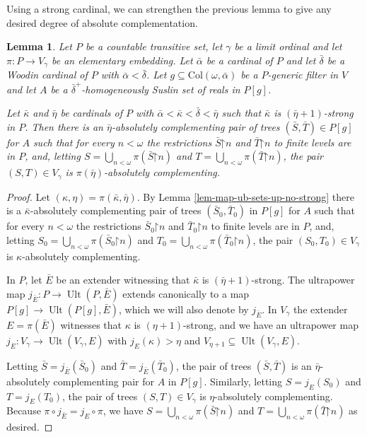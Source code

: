 \documentclass[fleqn, 11pt]{amsart}
\theoremstyle{plain}
\newtheorem{lem}[thm]{Lemma} \newtheorem*{lem*}{Lemma}
\theoremstyle{definition}
\theoremstyle{remark}
\newcommand{\Col}{\mathrm{Col}}
\newcommand{\restrict}{\mathord{\restriction}}
\DeclareMathOperator{\Ult}{Ult}
\begin{document}
Using a strong cardinal, we can strengthen the previous lemma to give any desired degree of absolute complementation.


\begin{lem}\label{lem-map-ub-sets-up}
 Let $P$ be a countable transitive set, let $\gamma$ be a limit ordinal and let $\pi \colon P \to V_{\gamma}$ be an elementary embedding. Let $\bar{\alpha}$ be a cardinal of $P$ and let $\bar{\delta}$ be a Woodin cardinal of $P$ with $\bar{\alpha} < \bar{\delta}$. Let $g \subseteq \Col(\omega,\bar{\alpha})$ be a $P$-generic filter in $V$ and let $A$ be a $\bar{\delta}^+$-homogeneously Suslin set of reals in $P[g]$.

 Let $\bar{\kappa}$ and $\bar{\eta}$ be cardinals of $P$ with $\bar{\alpha} < \bar{\kappa} < \bar{\delta} < \bar{\eta}$ such that $\bar{\kappa}$ is $(\bar{\eta}+1)$-strong in $P$. Then there is an $\bar{\eta}$-absolutely complementing pair of trees $(\bar{S},\bar{T}) \in P[g]$ for $A$ such that for every $n < \omega$ the restrictions $\bar{S}\restrict n$ and $\bar{T} \restrict n$ to finite levels are in $P$, and, letting $S = \bigcup_{n<\omega} \pi(\bar{S}\restrict n)$ and $T = \bigcup_{n<\omega} \pi(\bar{T}\restrict n)$, the pair $(S,T) \in V_{\gamma}$ is $\pi(\bar{\eta})$-absolutely complementing.
\end{lem}

\begin{proof}
 Let $(\kappa, \eta) = \pi(\bar{\kappa}, \bar{\eta})$. By Lemma \ref{lem-map-ub-sets-up-no-strong} there is a $\bar{\kappa}$-absolutely complementing pair of trees $(\bar{S}_0, \bar{T}_0)$ in $P[g]$ for $A$ such that for every $n < \omega$ the restrictions $\bar{S}_0\restrict n$ and $\bar{T}_0 \restrict n$ to finite levels are in $P$, and, letting $S_0 = \bigcup_{n<\omega} \pi(\bar{S}_0\restrict n)$ and $T_0 = \bigcup_{n<\omega} \pi(\bar{T}_0\restrict n)$, the pair $(S_0,T_0) \in V_{\gamma}$ is $\kappa$-absolutely complementing.
  
 In $P$, let $\bar{E}$ be an extender witnessing that $\bar{\kappa}$ is $(\bar{\eta}+1)$-strong. The ultrapower map $j_{\bar{E}} \colon P \to \Ult(P, \bar{E})$ extends canonically to a map $P[g] \to \Ult(P[g], \bar{E})$, which we will also denote by $j_{\bar{E}}$. In $V_{\gamma}$ the extender $E = \pi(\bar{E})$ witnesses that $\kappa$ is $(\eta+1)$-strong, and we have an ultrapower map $j_E : V_{\gamma} \to \Ult(V_{\gamma}, E)$ with $j_{E}(\kappa) > \eta$ and $V_{\eta + 1} \subseteq \Ult(V_{\gamma}, E)$. 

 Letting $\bar{S} = j_{\bar{E}}(\bar{S}_0)$ and $\bar{T} = j_{\bar{E}}(\bar{T}_0)$, the pair of trees $(\bar{S}, \bar{T})$ is an $\bar{\eta}$-absolutely complementing pair for $A$ in $P[g]$. Similarly, letting $S = j_E(S_0)$ and $T = j_E(T_0)$, the pair of trees $(S, T) \in V_{\gamma}$ is $\eta$-absolutely complementing. Because $\pi \circ j_{\bar{E}} = j_E \circ \pi$, we have $S = \bigcup_{n<\omega} \pi(\bar{S}\restrict n)$ and $T = \bigcup_{n<\omega} \pi(\bar{T}\restrict n)$ as desired.
\end{proof}
\end{document}
